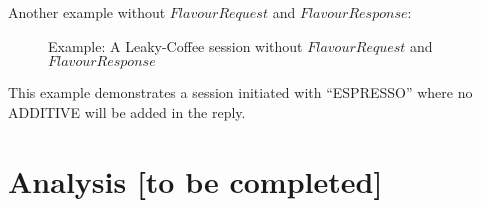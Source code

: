 \begin{example}
Another example without $FlavourRequest$ and $FlavourResponse$:

\begin{figure}[H] \label{Fig: Leaky-Coffee Example2}
\caption{Example: A Leaky-Coffee session without $FlavourRequest$ and $FlavourResponse$}
\centering
\resizebox{6cm}{!}
{}
\end{figure}

This example demonstrates a session initiated with “ESPRESSO” where no ADDITIVE will be added in the reply.
\end{example}

\section{Analysis [to be completed]}
